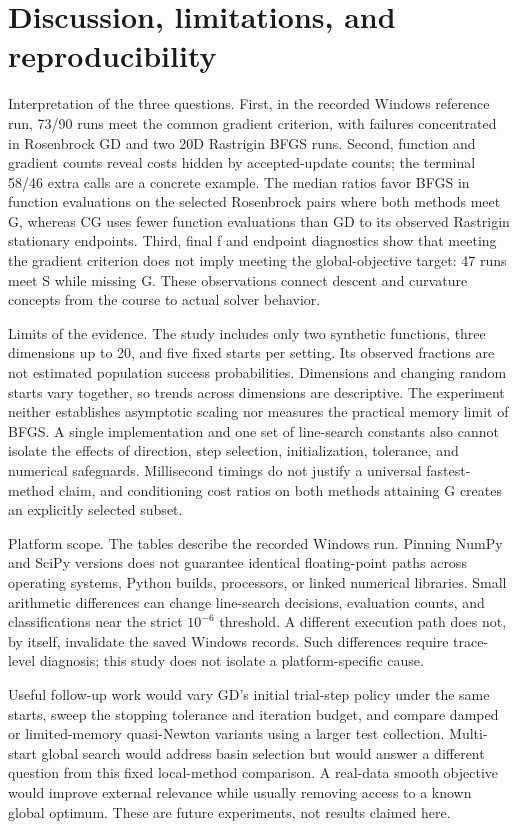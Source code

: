 \documentclass[10pt]{article}
\begin{document}
\newpage
\setcounter{section}{8}
\section{Discussion, limitations, and reproducibility}
Interpretation of the three questions. First, in the recorded Windows reference run, 73/90 runs meet the common gradient criterion, with failures concentrated in Rosenbrock GD and two 20D Rastrigin BFGS runs. Second, function and gradient counts reveal costs hidden by accepted-update counts; the terminal 58/46 extra calls are a concrete example. The median ratios favor BFGS in function evaluations on the selected Rosenbrock pairs where both methods meet G, whereas CG uses fewer function evaluations than GD to its observed Rastrigin stationary endpoints. Third, final f and endpoint diagnostics show that meeting the gradient criterion does not imply meeting the global-objective target: 47 runs meet S while missing G. These observations connect descent and curvature concepts from the course to actual solver behavior.

Limits of the evidence. The study includes only two synthetic functions, three dimensions up to 20, and five fixed starts per setting. Its observed fractions are not estimated population success probabilities. Dimensions and changing random starts vary together, so trends across dimensions are descriptive. The experiment neither establishes asymptotic scaling nor measures the practical memory limit of BFGS. A single implementation and one set of line-search constants also cannot isolate the effects of direction, step selection, initialization, tolerance, and numerical safeguards. Millisecond timings do not justify a universal fastest-method claim, and conditioning cost ratios on both methods attaining G creates an explicitly selected subset.

Platform scope. The tables describe the recorded Windows run. Pinning NumPy and SciPy versions does not guarantee identical floating-point paths across operating systems, Python builds, processors, or linked numerical libraries. Small arithmetic differences can change line-search decisions, evaluation counts, and classifications near the strict \(10^{-6}\) threshold. A different execution path does not, by itself, invalidate the saved Windows records. Such differences require trace-level diagnosis; this study does not isolate a platform-specific cause.

Useful follow-up work would vary GD's initial trial-step policy under the same starts, sweep the stopping tolerance and iteration budget, and compare damped or limited-memory quasi-Newton variants using a larger test collection. Multi-start global search would address basin selection but would answer a different question from this fixed local-method comparison. A real-data smooth objective would improve external relevance while usually removing access to a known global optimum. These are future experiments, not results claimed here.
\end{document}
